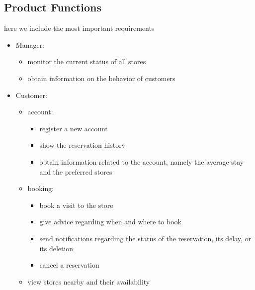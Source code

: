 \subsection{Product Functions}
here we include the most important requirements

\begin{itemize}
    \item Manager:
    \begin{itemize}
        \item monitor the current status of all stores
        \item obtain information on the behavior of customers
    \end{itemize}
    \item Customer:
    \begin{itemize}
        \item account:
        \begin{itemize}
            \item register a new account
            \item show the reservation history
            \item obtain information related to the account, namely the average stay and the preferred stores
        \end{itemize}
        \item booking:
        \begin{itemize}
            \item book a visit to the store
            \item give advice regarding when and where to book
            \item send notifications regarding the status of the reservation, its delay, or its deletion
            \item cancel a reservation
        \end{itemize}
        \item view stores nearby and their availability
    \end{itemize}
\end{itemize}


